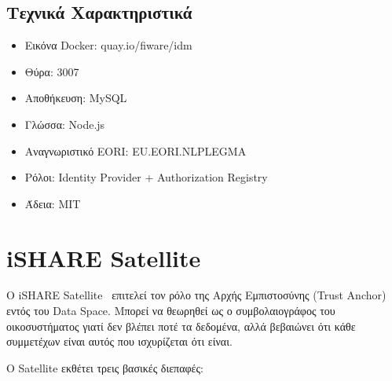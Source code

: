 \subsection{Τεχνικά Χαρακτηριστικά}
\label{subsec:keyrock-tech}

\begin{itemize}
    \item Εικόνα \textlatin{Docker}: \textlatin{quay.io/fiware/idm}
    \item Θύρα: \textlatin{3007}
    \item Αποθήκευση: \textlatin{MySQL}
    \item Γλώσσα: \textlatin{Node.js}
    \item Αναγνωριστικό \textlatin{EORI}:
    \textlatin{EU.EORI.NLPLEGMA}
    \item Ρόλοι: \textlatin{Identity Provider} +
    \textlatin{Authorization Registry}
    \item Άδεια: \textlatin{MIT}
\end{itemize}

\section{\textlatin{iSHARE Satellite}}
\label{sec:satellite}

Ο \textlatin{iSHARE Satellite}~\cite{ishare-satellite2023} επιτελεί
τον ρόλο της Αρχής Εμπιστοσύνης (\textlatin{Trust Anchor}) εντός
του \textlatin{Data Space}. Μπορεί να θεωρηθεί ως ο συμβολαιογράφος
του οικοσυστήματος γιατί δεν βλέπει ποτέ τα δεδομένα, αλλά βεβαιώνει ότι
κάθε συμμετέχων είναι αυτός που ισχυρίζεται ότι είναι.

Ο \textlatin{Satellite} εκθέτει τρεις βασικές διεπαφές:

